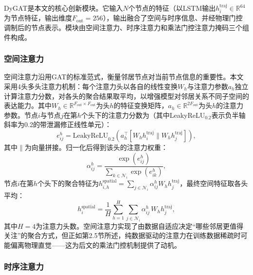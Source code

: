 \documentclass[12pt,a4paper,UTF8]{ctexart}
\begin{document}
DyGAT是本文的核心创新模块。它输入$N$个节点的特征（以LSTM输出$h_i^{\text{traj}}\in\mathbb{R}^{64}$为节点特征，输出维度$F_{\text{out}}=256$），输出融合了空间与时序信息、并经物理门控调制后的节点表示。模块由空间注意力、时序注意力和乘法门控注意力掩码三个组件构成。

\subsubsection{空间注意力}

空间注意力沿用GAT的标准范式，衡量邻居节点对当前节点信息的重要性。本文采用4头多头注意力机制：每个注意力头以各自的线性变换$W_h$与注意力参数$a_h$独立计算注意力分数，对各头的聚合结果取平均，以增强模型对邻居关系不同子空间的表达能力。其中$W_h\in\mathbb{R}^{F_{\text{out}}\times F_{\text{out}}}$为头$h$的特征变换矩阵，$a_h\in\mathbb{R}^{2F_{\text{out}}}$为头$h$的注意力参数。节点$i$与节点$j$在第$h$个头下的注意力分数为（其中LeakyReLU$_{0.2}$表示负半轴斜率为0.2的带泄漏修正线性单元）：
\begin{equation}
    e_{ij}^{h} = \text{LeakyReLU}_{0.2}\!\left(a_h^{\top}[W_h h_i^{\text{traj}} \parallel W_h h_j^{\text{traj}}]\right),
    \label{eq:spatial_score}
\end{equation}
其中$\parallel$为向量拼接。归一化后得到该头的注意力权重：
\begin{equation}
    \alpha_{ij}^{h} = \frac{\exp(e_{ij}^{h})}{\sum_{k\in\mathcal{N}_i}\exp(e_{ik}^{h})},
    \label{eq:spatial_softmax}
\end{equation}
节点$i$在第$h$个头下的聚合特征为$h_{i,h}^{\text{spatial}} = \sum_{j\in\mathcal{N}_i}\alpha_{ij}^{h} W_h h_j^{\text{traj}}$，最终空间特征取各头平均：
\begin{equation}
    h_i^{\text{spatial}} = \frac{1}{H}\sum_{h=1}^{H} \sum_{j\in\mathcal{N}_i}\alpha_{ij}^{h}\, W_h h_j^{\text{traj}},
    \label{eq:spatial_agg}
\end{equation}
其中$H=4$为注意力头数。空间注意力实现了由数据自适应决定“哪些邻居更值得关注”的聚合方式，但正如第2.5节所述，纯数据驱动的注意力在训练数据稀疏时可能偏离物理直觉——这为后文的乘法门控机制提供了动机。

\subsubsection{时序注意力}
\end{document}
